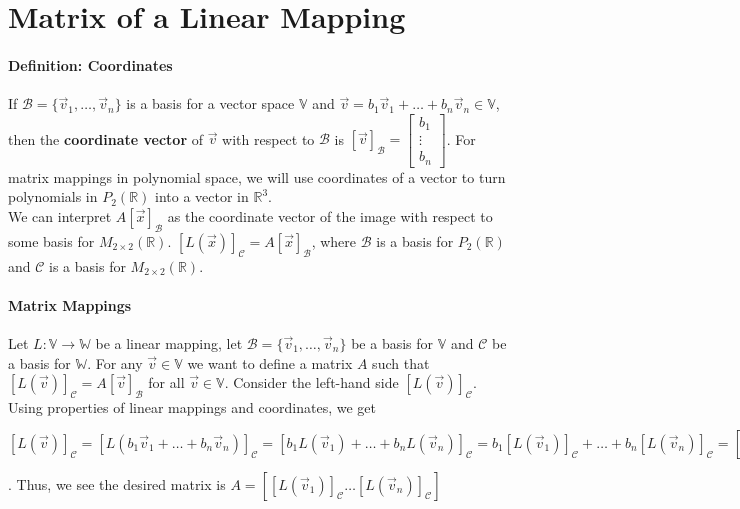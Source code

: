 \documentclass[10pt,letter]{article}
\begin{document}
\section*{Matrix of a Linear Mapping}
\paragraph{Definition: Coordinates} If $\mathcal{B}=\{\vec{v}_1,\ldots,\vec{v}_n\}$ is a basis for a vector space $\mathbb{V}$ and $\vec{v}=b_1\vec{v}_1+\ldots+b_n\vec{v}_n\in\mathbb{V}$, then the \textbf{coordinate vector} of $\vec{v}$ with respect to $\mathcal{B}$ is $[\vec{v}]_\mathcal{B}=\begin{bmatrix}b_1\\\vdots\\b_n\end{bmatrix}$. For matrix mappings in polynomial space, we will use coordinates of a vector to turn polynomials in $P_2(\mathbb{R})$ into a vector in $\mathbb{R}^3$. \\ 
We can interpret $A[\vec{x}]_\mathcal{B}$ as the coordinate vector of the image with respect to some basis for $M_{2\times2}(\mathbb{R})$. $[L(\vec{x})]_\mathcal{C}=A[\vec{x}]_\mathcal{B}$, where $\mathcal{B}$ is a basis for $P_2(\mathbb{R})$ and $\mathcal{C}$ is a basis for $M_{2\times2}(\mathbb{R})$.

\paragraph{Matrix Mappings} Let $L:\mathbb{V}\rightarrow\mathbb{W}$ be a linear mapping, let $\mathcal{B}=\{\vec{v}_1,\ldots,\vec{v}_n\}$ be a basis for $\mathbb{V}$ and $\mathcal{C}$ be a basis for $\mathbb{W}$. For any $\vec{v}\in\mathbb{V}$ we want to define a matrix $A$ such that $[L(\vec{v})]_\mathcal{C}=A[\vec{v}]_\mathcal{B}$ for all $\vec{v}\in\mathbb{V}$. Consider the left-hand side $[L(\vec{v})]_\mathcal{C}$. Using properties of linear mappings and coordinates, we get $[L(\vec{v})]_\mathcal{C}=[L(b_1\vec{v}_1+\ldots+b_n\vec{v}_n)]_\mathcal{C}=[b_1L(\vec{v}_1)+\ldots+b_nL(\vec{v}_n)]_\mathcal{C}=b_1[L(\vec{v}_1)]_\mathcal{C}+\ldots+b_n[L(\vec{v}_n)]_\mathcal{C}=\left[[L(\vec{v}_1)]_\mathcal{C}\ldots[L(\vec{v}_n)]_\mathcal{C}\right]\begin{bmatrix}b_1\\\vdots\\b_n\end{bmatrix}=A[\vec{v}]_\mathcal{B}$. Thus, we see the desired matrix is $A=\left[[L(\vec{v}_1)]_\mathcal{C}\ldots[L(\vec{v}_n)]_\mathcal{C}\right]$ 
\end{document}
